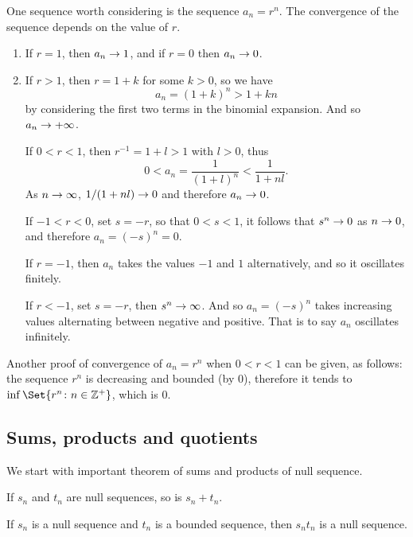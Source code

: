 \documentclass[main.tex]{subfiles}
\begin{document}
	One sequence worth considering is the sequence $a_n = r^n$. The convergence of the sequence depends on the value of $r$.
	\begin{enumerate}
		\item If $r = 1$, then $a_n \rightarrow 1$, and if $r = 0$ then $a_n \rightarrow 0$.
		
		\item If $r > 1$, then $r = 1 + k$ for some $k > 0$, so we have
		\begin{equation*}
		a_n = \left(1 + k\right)^n > 1 + kn
		\end{equation*}
		by considering the first two terms in the binomial expansion. And so $a_n \rightarrow +\infty$.
		
		\ii If $0 < r < 1$, then $r^{-1} = 1 + l > 1$ with $l > 0$, thus
		\begin{equation*}
			0 < a_n = \frac{1}{\left(1 + l\right)^n} < \frac{1}{1 + nl}.
		\end{equation*}
		As $n \rightarrow \infty$, $1/(1 + nl) \rightarrow 0$ and therefore $a_n \rightarrow 0$.
		
		\ii If $-1 < r < 0$, set $s = -r$, so that $0 < s < 1$, it follows that $s^n \rightarrow 0$ as $n \rightarrow 0$, and therefore $a_n = (-s)^n = 0$.
		
		\ii If $r = -1$, then $a_n$ takes the values $-1$ and $1$ alternatively, and so it oscillates finitely.
		
		\ii If $r < -1$, set $s = -r$, then $s^n \rightarrow \infty$. And so $a_n = (-s)^n$ takes increasing values alternating between negative and positive. That is to say $a_n$ oscillates infinitely.
 	\end{enumerate}
	Another proof of convergence of $a_n = r^n$ when $0 < r < 1$ can be given, as follows: the sequence $r^n$ is decreasing and bounded (by 0), therefore it tends to $\inf\Set{r^n \colon n \in \ZZ^{+}}$, which is 0.
		
	\subsection{Sums, products and quotients}
	We start with important theorem of sums and products of null sequence.
	\begin{theorem}
		If $s_n$ and $t_n$ are null sequences, so is $s_n + t_n$.
	\end{theorem}
	
	\begin{theorem}
		If $s_n$ is a null sequence and $t_n$ is a bounded sequence, then $s_n t_n$ is a null sequence.
	\end{theorem}
	
\end{document}
